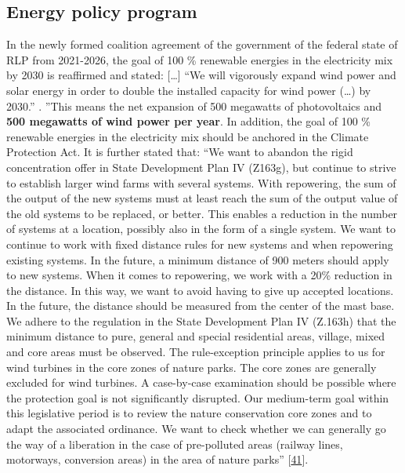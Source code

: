 \documentclass[a4paper,11pt]{article}
\begin{document}
\hypertarget{energy-policy-program}{%
\subsection{Energy policy program}\label{energy-policy-program}}

In the newly formed coalition agreement of the government of the federal state of RLP from 2021-2026, the goal of 100 \% renewable energies in the electricity mix by 2030 is reaffirmed and stated: {[}\ldots{]} ``We will vigorously expand wind power and solar energy in order to double the installed capacity for wind power (\ldots) by 2030.'' . ''This means the net expansion of 500 megawatts of photovoltaics and \textbf{500 megawatts of wind power per year}. In addition, the goal of 100 \% renewable energies in the electricity mix should be anchored in the Climate Protection Act. It is further stated that:
``We want to abandon the rigid concentration offer in State Development Plan IV (Z163g), but continue to strive to establish larger wind farms with several systems. With repowering, the sum of the output of the new systems must at least reach the sum of the output value of the old systems to be replaced, or better. This enables a reduction in the number of systems at a location, possibly also in the form of a single system. We want to continue to work with fixed distance rules for new systems and when repowering existing systems. In the future, a minimum distance of 900 meters should apply to new systems. When it comes to repowering, we work with a 20\% reduction in the distance. In this way, we want to avoid having to give up accepted locations. In the future, the distance should be measured from the center of the mast base. We adhere to the regulation in the State Development Plan IV (Z.163h) that the minimum distance to pure, general and special residential areas, village, mixed and core areas must be observed. The rule-exception principle applies to us for wind turbines in the core zones of nature parks. The core zones are generally excluded for wind turbines. A case-by-case examination should be possible where the protection goal is not significantly disrupted. Our medium-term goal within this legislative period is to review the nature conservation core zones and to adapt the associated ordinance. We want to check whether we can generally go the way of a liberation in the case of pre-polluted areas (railway lines, motorways, conversion areas) in the area of nature parks'' {[}\protect\hyperlink{ref-SPD.2021}{41}{]}.
\end{document}
